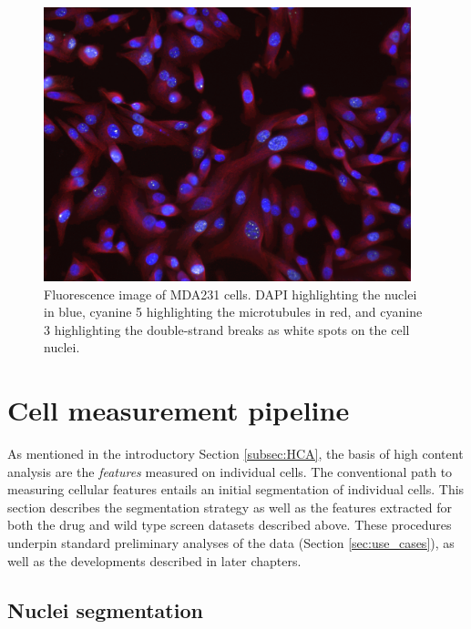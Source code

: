 \begin{figure}[h]
\begin{center}
\includegraphics[width=0.95\textwidth]{img/channels.png}
\caption{Fluorescence image of MDA231 cells. DAPI highlighting the nuclei in blue, cyanine 5 highlighting the microtubules in red, and cyanine 3 highlighting the double-strand breaks as white spots on the cell nuclei.}
\label{fig:drug_full_fluorescence}
\end{center}
\end{figure}

\section{Cell measurement pipeline}
\label{sec:cell_measurement}

As mentioned in the introductory Section \ref{subsec:HCA}, the basis of high content analysis are the \emph{features} measured on individual cells. The conventional path to measuring cellular features entails an initial segmentation of individual cells. This section describes the segmentation strategy as well as the features extracted for both the drug and wild type screen datasets described above. These procedures underpin standard preliminary analyses of the data (Section \ref{sec:use_cases}), as well as the developments described in later chapters.


\subsection{Nuclei segmentation}

